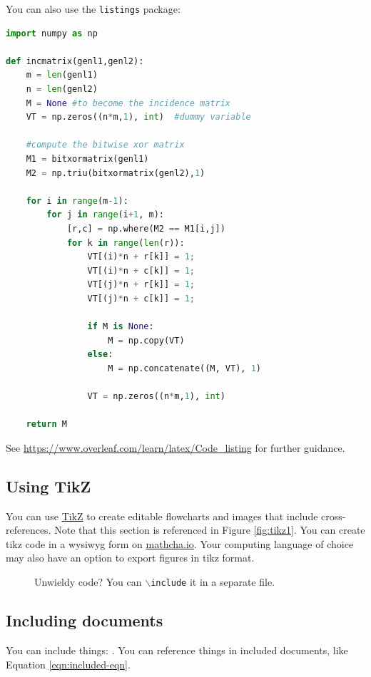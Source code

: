 \documentclass{article}
\begin{document}
You can also use the \texttt{listings} package:
\begin{lstlisting}[language=Python, caption=Python example]
import numpy as np
    
def incmatrix(genl1,genl2):
    m = len(genl1)
    n = len(genl2)
    M = None #to become the incidence matrix
    VT = np.zeros((n*m,1), int)  #dummy variable
    
    #compute the bitwise xor matrix
    M1 = bitxormatrix(genl1)
    M2 = np.triu(bitxormatrix(genl2),1) 

    for i in range(m-1):
        for j in range(i+1, m):
            [r,c] = np.where(M2 == M1[i,j])
            for k in range(len(r)):
                VT[(i)*n + r[k]] = 1;
                VT[(i)*n + c[k]] = 1;
                VT[(j)*n + r[k]] = 1;
                VT[(j)*n + c[k]] = 1;
                
                if M is None:
                    M = np.copy(VT)
                else:
                    M = np.concatenate((M, VT), 1)
                
                VT = np.zeros((n*m,1), int)
    
    return M
\end{lstlisting}

See \url{https://www.overleaf.com/learn/latex/Code_listing} for further guidance.


\subsection{Using TikZ}
\label{sec:tikz}
You can use \href{https://texample.net//tikz/examples/}{TikZ} to create editable flowcharts and images that include cross-references. Note that this section is referenced in Figure \ref{fig:tikz1}. You can create tikz code in a \acrshort{wysiwyg} form on \url{mathcha.io}. Your computing language of choice may also have an option to export figures in tikz format. 



\begin{figure}
    \centering
    
    \caption{Unwieldy code? You can \texttt{$\backslash$include} it in a separate file. }
    \label{fig:tikz2}
\end{figure}

\subsection{Including documents}
You can include things:
. You can reference things in included documents, like Equation \ref{eqn:included-eqn}.
\end{document}
